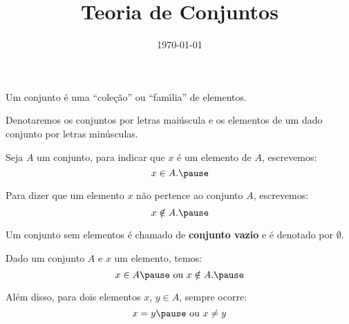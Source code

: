 \documentclass{beamer}
\title{Teoria de Conjuntos}
\author[\autor]{\autor}
\institute[\instituto]{\instituto}
\date{\today}
\begin{document}
    \begin{frame}
        \maketitle
    \end{frame}


    \begin{frame}
        Um conjunto {\'e} uma ``cole{\c c}{\~a}o'' ou ``fam{\'\i}lia'' de elementos.\pause

        Denotaremos os conjuntos por letras mai\'uscula e os elementos de um dado conjunto por letras min{\'u}sculas.\pause

        Seja $A$ um conjunto, para indicar que $x$ {\'e} um elemento de $A$, escrevemos:
        \[
            x \in A.\pause
        \]

        Para dizer que um elemento $x$ n{\~a}o pertence ao conjunto $A$, escrevemos:
        \[
            x \notin A.\pause
        \]

        Um conjunto sem elementos {\'e} chamado de \textbf{conjunto vazio} e {\'e} denotado por $\emptyset$.\pause

        Dado um conjunto $A$ e $x$ um elemento, temos:\pause
        \[
            x \in A\pause \mbox{ ou } x \notin A.\pause
        \]

        Al{\'e}m disso, para dois elementos $x$, $y \in A$, sempre ocorre:\pause
        \[
            x = y\pause \mbox{ ou } x \neq y
        \]
    \end{frame}
\end{document}
